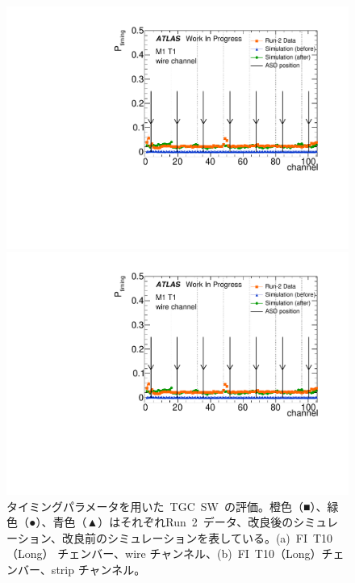 \begin{figure}[H]
	\begin{minipage}{0.49\hsize}
	\centering			
	\includegraphics[width=\textwidth,page=36]{img/pdf5/master_timingplot_comp.pdf}
	\subcaption{}
	\end{minipage}
	\begin{minipage}{0.49\hsize}
	\centering
	\includegraphics[width=\textwidth,page=37]{img/pdf5/master_timingplot_comp.pdf}
	\subcaption{}
	\end{minipage}
    \caption[タイミングパラメータを用いた~TGC~SW~の評価]{タイミングパラメータを用いた~TGC~SW~の評価。橙色（■）、緑色（●）、青色（▲）はそれぞれRun~2~データ、改良後のシミュレーション、改良前のシミュレーションを表している。(a)~FI~T10（Long） チェンバー、wire チャンネル、(b)~FI~T10（Long）チェンバー、strip チャンネル。}
	\label{fig:timingPlotSW}
\end{figure}

